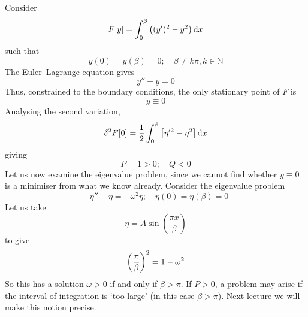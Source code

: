 \begin{example}
	Consider
	\[
		F[y] = \int_0^\beta \qty((y')^2 - y^2)\dd{x}
	\]
	such that
	\[
		y(0) = y(\beta) = 0;\quad \beta \neq k\pi, k \in \mathbb N
	\]
	The Euler--Lagrange equation gives
	\[
		y'' + y = 0
	\]
	Thus, constrained to the boundary conditions, the only stationary point of \( F \) is
	\[
		y \equiv 0
	\]
	Analysing the second variation,
	\[
		\delta^2 F[0] = \frac{1}{2} \int_0^\beta \qty[\eta'^2 - \eta^2] \dd{x}
	\]
	giving
	\[
		P = 1 > 0;\quad Q < 0
	\]
	Let us now examine the eigenvalue problem, since we cannot find whether \( y \equiv 0 \) is a minimiser from what we know already.
	Consider the eigenvalue problem
	\[
		-\eta'' - \eta = -\omega^2 \eta;\quad \eta(0) = \eta(\beta) = 0
	\]
	Let us take
	\[
		\eta = A \sin(\frac{\pi x}{\beta})
	\]
	to give
	\[
		\qty(\frac{\pi}{\beta})^2 = 1 - \omega^2
	\]
	So this has a solution \( \omega > 0 \) if and only if \( \beta > \pi \).
	If \( P > 0 \), a problem may arise if the interval of integration is `too large' (in this case \( \beta > \pi \)).
	Next lecture we will make this notion precise.
\end{example}

